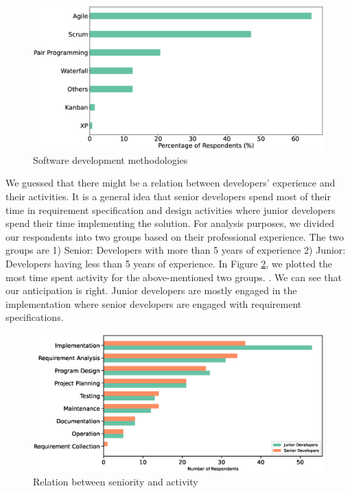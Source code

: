 \begin{figure}[h]
\centering
  \includegraphics[scale=0.18]{Figures/Respondents_Methodology}
  \caption{Software development methodologies}
  \label{fig:methodologies}
\end{figure}
We guessed that there might be a relation between developers' experience and their activities. It is a general idea that senior developers spend most of their time in requirement specification and design activities where junior developers spend their time implementing the solution. For analysis purposes, we divided our respondents into two groups based on their professional experience. The two groups are 1) Senior: Developers with more than 5 years of experience 2) Junior: Developers having less than 5 years of experience. In Figure \ref{fig:activity and seniority}, we plotted the most time spent activity for the above-mentioned two groups. . We can see that our anticipation is right. Junior developers are mostly engaged in the implementation where senior developers are engaged with requirement specifications.

\begin{figure}[h]
\centering
  \includegraphics[scale=0.4]{Figures/Activity_and_Seniority.eps}
  \caption{Relation between seniority and activity}
  \label{fig:activity and seniority}
\end{figure}

